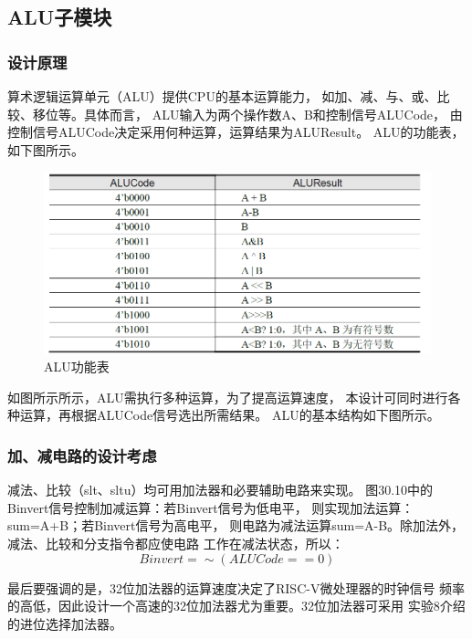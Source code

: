 \documentclass[12pt,hyperref,a4paper,UTF8]{ctexart}
\begin{document}
  \newpage






\subsection{ALU子模块}
\subsubsection*{\Large 设计原理}
\normalsize
算术逻辑运算单元（ALU）提供CPU的基本运算能力，
如加、减、与、或、比较、移位等。具体而言，
ALU输入为两个操作数A、B和控制信号ALUCode，
由控制信号ALUCode决定采用何种运算，运算结果为ALUResult。
ALU的功能表，如下图所示。
    \begin{figure}[H]
        \centering
        \includegraphics[width=1\textwidth]{figures/fig/image9.png}
        \caption{ALU功能表}
    \end{figure}

如图所示所示，ALU需执行多种运算，为了提高运算速度，
本设计可同时进行各种运算，再根据ALUCode信号选出所需结果。
ALU的基本结构如下图所示。

\subsubsection*{加、减电路的设计考虑}
减法、比较（slt、sltu）均可用加法器和必要辅助电路来实现。
图30.10中的Binvert信号控制加减运算：若Binvert信号为低电平，
则实现加法运算：sum=A+B；若Binvert信号为高电平，
则电路为减法运算sum=A-B。除加法外，减法、比较和分支指令都应使电路
工作在减法状态，所以：
\begin{equation}
Binvert = \sim(ALUCode == 0) 
\end{equation}

最后要强调的是，32位加法器的运算速度决定了RISC-V微处理器的时钟信号
频率的高低，因此设计一个高速的32位加法器尤为重要。32位加法器可采用
实验8介绍的进位选择加法器。
\end{document}
